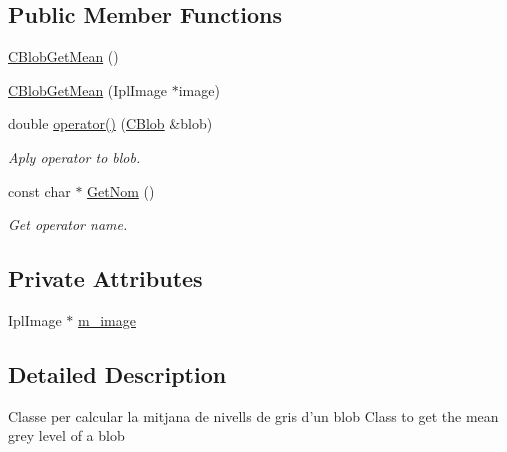 \subsection*{Public Member Functions}
\begin{DoxyCompactItemize}
\item 
\hyperlink{classCBlobGetMean_ac79368faad6b088d11fe864e473bc00a}{C\-Blob\-Get\-Mean} ()
\item 
\hyperlink{classCBlobGetMean_ae77b75cea8c5c87b7ed1eb17544e8775}{C\-Blob\-Get\-Mean} (Ipl\-Image $\ast$image)
\item 
double \hyperlink{classCBlobGetMean_ad1aff39c601989402d096fb649b9703c}{operator()} (\hyperlink{classCBlob}{C\-Blob} \&blob)
\begin{DoxyCompactList}\small\item\em Aply operator to blob. \end{DoxyCompactList}\item 
const char $\ast$ \hyperlink{classCBlobGetMean_a1992d893f77cf9be2fc6d3521fd51639}{Get\-Nom} ()
\begin{DoxyCompactList}\small\item\em Get operator name. \end{DoxyCompactList}\end{DoxyCompactItemize}
\subsection*{Private Attributes}
\begin{DoxyCompactItemize}
\item 
Ipl\-Image $\ast$ \hyperlink{classCBlobGetMean_a94dac875f2005e26879b3550bb13749f}{m\-\_\-image}
\end{DoxyCompactItemize}


\subsection{Detailed Description}
Classe per calcular la mitjana de nivells de gris d'un blob Class to get the mean grey level of a blob 


